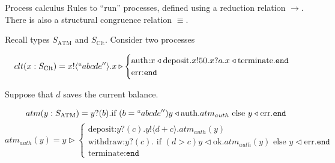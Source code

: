 \begin{frame}{Process calculus}
  Rules to ``run'' processes, defined using a reduction relation $\longrightarrow$. There is also a structural congruence relation $\equiv$.

  Recall types $S_\text{ATM}$ and $S_\text{Clt}$. Consider two processes

  $$clt(x: S_\text{Clt}) = x!\langle ``abcde'' \rangle. x \triangleright
    \begin{cases}
      \text{auth:} x\triangleleft \text{deposit}. x!50.x?a.x\triangleleft \text{terminate}.\texttt{end} \\
      \text{err:} \texttt{end}
    \end{cases}$$

  Suppose that $d$ saves the current balance.

  $$atm(y: S_\text{ATM}) = y?(b). \text{if } (b = ``abcde'') y \triangleleft \text{auth}. atm_{auth}  \text{ else } y \triangleleft \text{err}.\texttt{end}$$
  $$atm_{auth}(y) = y \triangleright
    \begin{cases}
      \text{deposit:} y?(c).y!\langle d+c \rangle.atm_{auth}(y)                                                                                \\
      \text{withdraw:} y?(c). \text{ if } (d > c) y\triangleleft \text{ok}.atm_{auth}(y) \text{ else } y \triangleleft \text{err}.\texttt{end} \\
      \text{terminate:} \texttt{end}
    \end{cases}$$
\end{frame}

